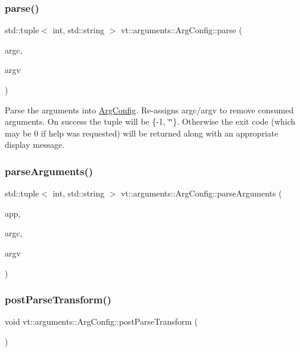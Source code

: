 \subsubsection{\texorpdfstring{parse()}{parse()}}
{\footnotesize\ttfamily std\+::tuple$<$ int, std\+::string $>$ vt\+::arguments\+::\+Arg\+Config\+::parse (\begin{DoxyParamCaption}\item[{int \&}]{argc,  }\item[{char $\ast$$\ast$\&}]{argv }\end{DoxyParamCaption})}

Parse the arguments into \hyperlink{structvt_1_1arguments_1_1_arg_config}{Arg\+Config}. Re-\/assigns argc/argv to remove consumed arguments. On success the tuple will be \{-\/1, \char`\"{}\char`\"{}\}. Otherwise the exit code (which may be 0 if help was requested) will be returned along with an appropriate display message. \mbox{\label{structvt_1_1arguments_1_1_arg_config_ac6711ab96113f032b9e0a0b12d24eda3}} 
\subsubsection{\texorpdfstring{parse\+Arguments()}{parseArguments()}}
{\footnotesize\ttfamily std\+::tuple$<$ int, std\+::string $>$ vt\+::arguments\+::\+Arg\+Config\+::parse\+Arguments (\begin{DoxyParamCaption}\item[{C\+L\+I\+::\+App \&}]{app,  }\item[{int \&}]{argc,  }\item[{char $\ast$$\ast$\&}]{argv }\end{DoxyParamCaption})}

\mbox{\label{structvt_1_1arguments_1_1_arg_config_a688dc6a1e88d8544e2ab41b4db15d8cd}} 
\subsubsection{\texorpdfstring{post\+Parse\+Transform()}{postParseTransform()}}
{\footnotesize\ttfamily void vt\+::arguments\+::\+Arg\+Config\+::post\+Parse\+Transform (\begin{DoxyParamCaption}{ }\end{DoxyParamCaption})\hspace{0.3cm}{\ttfamily [private]}}

